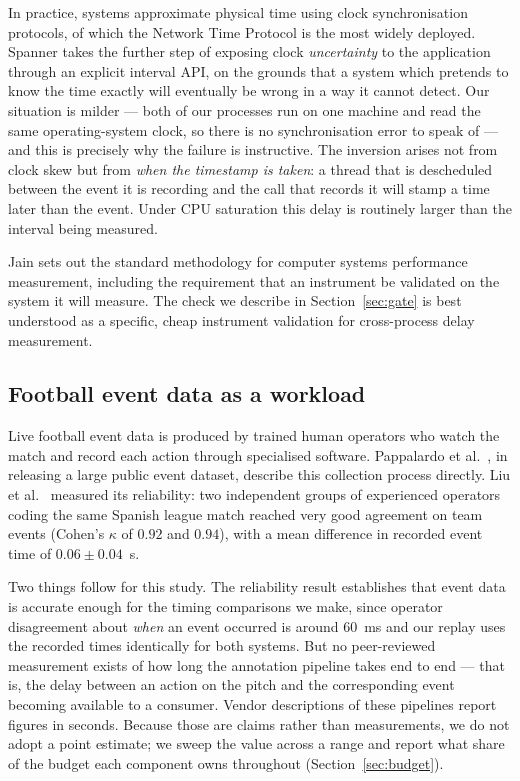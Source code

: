 \documentclass[Afour,sageh,times]{sagej}
\begin{document}
In practice, systems approximate physical time using clock synchronisation protocols, of which
the Network Time Protocol \cite{mills1991ntp} is the most widely deployed. Spanner
\cite{corbett2013spanner} takes the further step of exposing clock \emph{uncertainty} to the
application through an explicit interval API, on the grounds that a system which pretends to know
the time exactly will eventually be wrong in a way it cannot detect. Our situation is milder ---
both of our processes run on one machine and read the same operating-system clock, so there is no
synchronisation error to speak of --- and this is precisely why the failure is instructive. The
inversion arises not from clock skew but from \emph{when the timestamp is taken}: a thread that
is descheduled between the event it is recording and the call that records it will stamp a time
later than the event. Under CPU saturation this delay is routinely larger than the interval being
measured.

Jain \cite{jain1991art} sets out the standard methodology for computer systems performance
measurement, including the requirement that an instrument be validated on the system it will
measure. The check we describe in Section~\ref{sec:gate} is best understood as a specific,
cheap instrument validation for cross-process delay measurement.

\subsection{Football event data as a workload}
\label{sec:lit_football}

Live football event data is produced by trained human operators who watch the match and record
each action through specialised software. Pappalardo et al.\ \cite{pappalardo2019public}, in
releasing a large public event dataset, describe this collection process directly. Liu et al.\
\cite{liu2013interoperator} measured its reliability: two independent groups of experienced
operators coding the same Spanish league match reached very good agreement on team events (Cohen's
$\kappa$ of $0.92$ and $0.94$), with a mean difference in recorded event time of
$0.06 \pm 0.04$~s.

Two things follow for this study. The reliability result establishes that event data is accurate
enough for the timing comparisons we make, since operator disagreement about \emph{when} an event
occurred is around $60$~ms and our replay uses the recorded times identically for both systems.
But no peer-reviewed measurement exists of how long the annotation pipeline takes end to end ---
that is, the delay between an action on the pitch and the corresponding event becoming available
to a consumer. Vendor descriptions of these pipelines report figures in seconds. Because those
are claims rather than measurements, we do not adopt a point estimate; we sweep the value across a
range and report what share of the budget each component owns throughout
(Section~\ref{sec:budget}).
\end{document}
